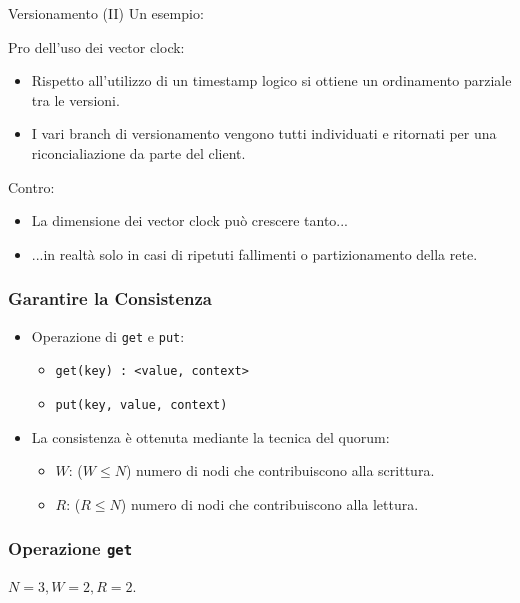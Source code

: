 \begin{frame}{Versionamento (II)}
  Un esempio:

  \begin{block}{Pro dell'uso dei vector clock:}
    \begin{itemize}
    \item Rispetto all'utilizzo di un timestamp logico si ottiene un ordinamento parziale tra le versioni.
    \item I vari branch di versionamento vengono tutti individuati e ritornati per una riconcialiazione da parte del client.
    \end{itemize}
  \end{block}

  \begin{block}{Contro:}
    \begin{itemize}
    \item La dimensione dei vector clock può crescere tanto...
    \item ...in realtà solo in casi di ripetuti fallimenti o partizionamento della rete.
    \end{itemize}
  \end{block}
\end{frame}

\begin{frame}
  \frametitle{Garantire la Consistenza}
  \begin{itemize}
  \item Operazione di \texttt{get} e \texttt{put}:
    \begin{itemize}
    \item \texttt{get(key) : <value, context>}
    \item \texttt{put(key, value, context)}
    \end{itemize}
  \end{itemize}
  \begin{itemize}
  \item La consistenza è ottenuta mediante la tecnica del \alert{quorum}:
    \begin{itemize}
    \item $W$: ($W \leq N$) numero di nodi che contribuiscono alla scrittura.
    \item $R$: ($R \leq N$) numero di nodi che contribuiscono alla lettura.
    \end{itemize}
  \end{itemize}
\end{frame}


\begin{frame}
  \frametitle{Operazione \texttt{get}}
  $N = 3, W = 2, R = 2.$
\end{frame}


